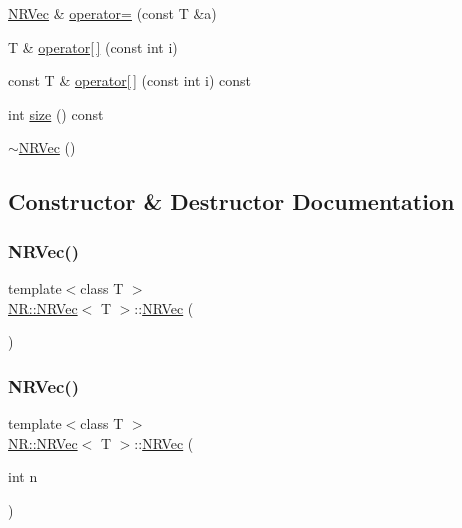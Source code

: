 \begin{DoxyCompactItemize}
\item 
\mbox{\hyperlink{classNR_1_1NRVec}{N\+R\+Vec}} \& \mbox{\hyperlink{classNR_1_1NRVec_af2d6c1894e28979a9c758a2f103832ee}{operator=}} (const T \&a)
\item 
T \& \mbox{\hyperlink{classNR_1_1NRVec_aa06286b2b6a9a51dd275d17c1b777bed}{operator\mbox{[}$\,$\mbox{]}}} (const int i)
\item 
const T \& \mbox{\hyperlink{classNR_1_1NRVec_a96caa29f8fb313218804268101c95e1a}{operator\mbox{[}$\,$\mbox{]}}} (const int i) const
\item 
int \mbox{\hyperlink{classNR_1_1NRVec_ab0dfb2d7ce74022fa0ce42138f4a224b}{size}} () const
\item 
\mbox{\hyperlink{classNR_1_1NRVec_a7161dfe4a95a73eca56d084c662f8eae}{$\sim$\+N\+R\+Vec}} ()
\end{DoxyCompactItemize}


\subsection{Constructor \& Destructor Documentation}
\mbox{\label{classNR_1_1NRVec_a3c549533b11738d9c1320abd0078f5aa}} 
\subsubsection{\texorpdfstring{NRVec()}{NRVec()}\hspace{0.1cm}{\footnotesize\ttfamily [1/15]}}
{\footnotesize\ttfamily template$<$class T $>$ \\
\mbox{\hyperlink{classNR_1_1NRVec}{N\+R\+::\+N\+R\+Vec}}$<$ T $>$\+::\mbox{\hyperlink{classNR_1_1NRVec}{N\+R\+Vec}} (\begin{DoxyParamCaption}{ }\end{DoxyParamCaption})}

\mbox{\label{classNR_1_1NRVec_a32e1c3a7b161ae48f90e95f44261c385}} 
\subsubsection{\texorpdfstring{NRVec()}{NRVec()}\hspace{0.1cm}{\footnotesize\ttfamily [2/15]}}
{\footnotesize\ttfamily template$<$class T $>$ \\
\mbox{\hyperlink{classNR_1_1NRVec}{N\+R\+::\+N\+R\+Vec}}$<$ T $>$\+::\mbox{\hyperlink{classNR_1_1NRVec}{N\+R\+Vec}} (\begin{DoxyParamCaption}\item[{int}]{n }\end{DoxyParamCaption})\hspace{0.3cm}{\ttfamily [explicit]}}

